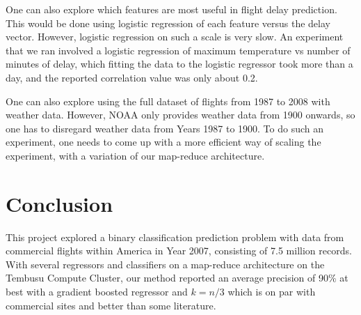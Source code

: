 \documentclass[letterpaper,11pt]{article}
\begin{document}
One can also explore which features are most useful in flight delay prediction. This would be done using logistic regression of each feature versus the delay vector. However, logistic regression on such a scale is very slow. An experiment that we ran involved a logistic regression of maximum temperature vs number of minutes of delay, which fitting the data to the logistic regressor took more than a day, and the reported correlation value was only about 0.2. 

One can also explore using the full dataset of flights from 1987 to 2008 with weather data. However, NOAA only provides weather data from 1900 onwards, so one has to disregard weather data from Years 1987 to 1900. To do such an experiment, one needs to come up with a more efficient way of scaling the experiment, with a variation of our map-reduce architecture.

\section{Conclusion}
This project explored a binary classification prediction problem with data from commercial flights within America in Year 2007, consisting of 7.5 million records. With several regressors and classifiers on a map-reduce architecture on the Tembusu Compute Cluster, our method reported an average precision of 90\% at best with a gradient boosted regressor and $k=n/3$ which is on par with commercial sites and better than some literature.



\end{document}
